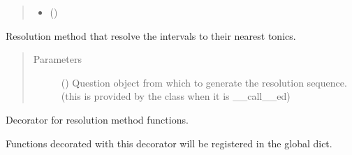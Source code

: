 \documentclass[letterpaper,10pt,english]{sphinxmanual}
\begin{document}
\begin{fulllineitems}
\begin{fulllineitems}
\begin{quote}
\begin{description}
\begin{itemize}
\item {} 
\sphinxAtStartPar
{} () \textendash{} 

\end{itemize}

\end{description}\end{quote}

\end{fulllineitems}


\end{fulllineitems}


\begin{fulllineitems}
\label{\detokenize{index:birdears.resolution.nearest_tonic}}
\sphinxAtStartPar
Resolution method that resolve the intervals to their nearest tonics.
\begin{quote}\begin{description}
\item[{Parameters}] \leavevmode
\sphinxAtStartPar
{} () \textendash{} Question object from which to generate the
resolution sequence. (this is provided by the  class
when it is {\color{red}\bfseries{}\textasciigrave{}}\_\_call\_\_\textasciigrave{}ed)

\end{description}\end{quote}

\end{fulllineitems}


\begin{fulllineitems}
\label{\detokenize{index:birdears.resolution.register_resolution_method}}
\sphinxAtStartPar
Decorator for resolution method functions.

\sphinxAtStartPar
Functions decorated with this decorator will be registered in the
 global dict.

\end{fulllineitems}
\end{document}
